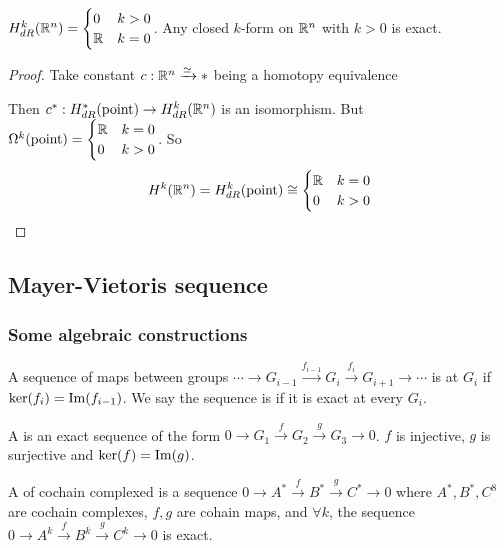 
\begin{corollary}\label{Poincare Lemma}
     $ H^k_{dR}(\mathbb R^n)=\displaystyle\begin{cases}
        0 &k>0\\
        \mathbb R &k=0
     \end{cases} $. \ie Any closed  $ k $-form on  $ \mathbb R^n $ with  $ k>0 $  is exact. 
\end{corollary}
\begin{proof}
    Take constant  $ c:\mathbb R^n\xrightarrow{\simeq} *$ being a homotopy equivalence

    Then  $ c^*:H^*_{dR}(\text{point})\rightarrow H_{dR}^k(\mathbb R^n) $ is an isomorphism. But  $ \Omega^k(\text{point})=\begin{cases}
        \mathbb R &k=0\\
        0 &k>0
    \end{cases}  $. So
    \begin{equation*}
        H^k(\mathbb R^n)=H^k_{dR}(\text{point})\cong\begin{cases}
            \mathbb R&k=0\\
            0&k>0
        \end{cases}
    \end{equation*} 
\end{proof}
\subsection{Mayer-Vietoris sequence}
\subsubsection{Some algebraic constructions}
A sequence of maps between groups  $ \cdots\rightarrow G_{i-1}\xrightarrow{f_{i-1}} G_i\xrightarrow{f_i} G_{i+1}\rightarrow\cdots $ is  at  $ G_i $  if  $ \ker(f_i)=\mathrm{Im}(f_{i-1}) $. 
We say the sequence is  if it is exact at every  $ G_i$.

A  is an exact sequence of the form  $ 0\rightarrow G_1\xrightarrow{f} G_2\xrightarrow{g} G_3\rightarrow 0 $. \ie  $ f  $ is injective,  $ g  $ is surjective and  $ \ker(f)=\mathrm{Im}(g) $.

A  of cochain complexed is a sequence  $ 0\rightarrow A^*\xrightarrow{f}B^*\xrightarrow{g}C^*\rightarrow 0 $ where  $ A^*,B^*,C^8 $ are cochain complexes,  $ f,g $ are cohain maps, and  $ \forall k $, the sequence  $ 0\rightarrow A^k\xrightarrow{f}B^k\xrightarrow{g}C^k\rightarrow 0 $     is exact.

